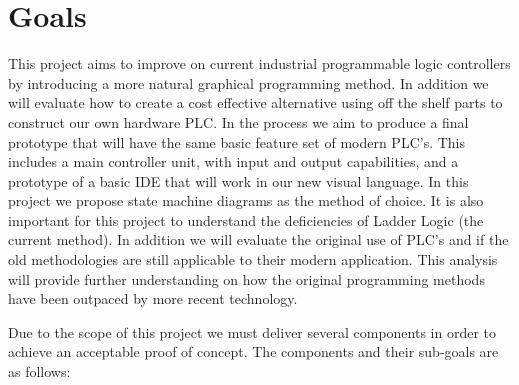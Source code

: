 \section{Goals}

This project aims to improve on current industrial programmable logic controllers by introducing a more natural graphical programming method. In addition we will evaluate how to create a cost effective alternative using off the shelf parts to construct our own hardware PLC. In the process we aim to produce a final prototype that will have the same basic feature set of modern PLC's. This includes a main controller unit, with input and output capabilities, and a prototype of a basic IDE that will work in our new visual language. In this project we propose state machine diagrams as the method of choice. It is also important for this project to understand the deficiencies of Ladder Logic (the current method). In addition we will evaluate the original use of PLC's and if the old methodologies are still applicable to their modern application. This analysis will provide further understanding on how the original programming methods have been outpaced by more recent technology.

Due to the scope of this project we must deliver several components in order to achieve an acceptable proof of concept. The components and their sub-goals are as follows:

